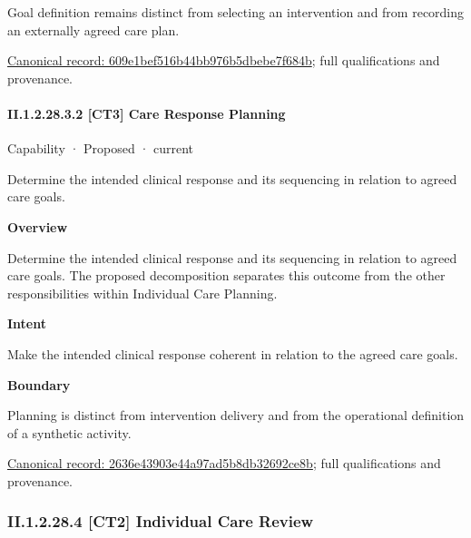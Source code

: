 Goal definition remains distinct from selecting an intervention and from recording an externally agreed care plan.


{\footnotesize \href{../../../../continuum/strategy/capability/609e1bef516b44bb976b5dbebe7f684b.md}{Canonical record: 609e1bef516b44bb976b5dbebe7f684b}; full qualifications and provenance.}\par
\paragraph*{II.1.2.28.3.2 [CT3] Care Response Planning}
\label{navigation:II.1.2.28.3.2}

\label{element:2636e43903e44a97ad5b8db32692ce8b}
{\small Capability · Proposed · current}\par

Determine the intended clinical response and its sequencing in relation to agreed care goals.



\textbf{Overview}



Determine the intended clinical response and its sequencing in relation to agreed care goals. The proposed decomposition separates this outcome from the other responsibilities within Individual Care Planning.



\textbf{Intent}



Make the intended clinical response coherent in relation to the agreed care goals.



\textbf{Boundary}



Planning is distinct from intervention delivery and from the operational definition of a synthetic activity.


{\footnotesize \href{../../../../continuum/strategy/capability/2636e43903e44a97ad5b8db32692ce8b.md}{Canonical record: 2636e43903e44a97ad5b8db32692ce8b}; full qualifications and provenance.}\par
\subsubsection*{II.1.2.28.4 [CT2] Individual Care Review}
\label{navigation:II.1.2.28.4}

